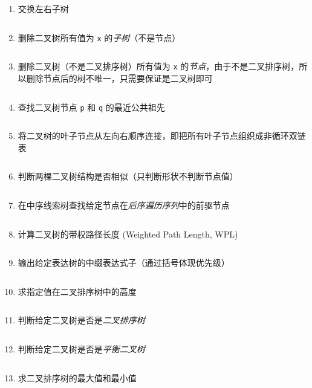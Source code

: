 \documentclass{ctexart}
\begin{document}
\begin{enumerate}
    \item 交换左右子树
        \inputminted{c}{codes/swap-bitree.c}

    \item 删除二叉树所有值为 \texttt{x} 的\emph{子树}（不是节点）
        \inputminted{c}{codes/delete-all-subtree-x-from-bitree.c}

    \item 删除二叉树（不是二叉排序树）所有值为 \texttt{x} 的\emph{节点}，由于不是二叉排序树，所以删除节点后的树不唯一，只需要保证是二叉树即可
        \inputminted{c}{codes/delete-all-x-from-bitree.c}

    \item 查找二叉树节点 \texttt{p} 和 \texttt{q} 的最近公共祖先
        \inputminted{c}{codes/common-ancestor.c}

    \item 将二叉树的叶子节点从左向右顺序连接，即把所有叶子节点组织成非循环双链表
        \inputminted{c}{codes/link-leafs-of-bitree.c}

    \item 判断两棵二叉树结构是否相似（只判断形状不判断节点值）
        \inputminted{c}{codes/is-same-bitree.c}

    \item 在中序线索树查找给定节点在\emph{后序遍历序列}中的前驱节点
        \inputminted{c}{codes/find-previous-node-of-postorder-in-inthreadtree.c}

    \item 计算二叉树的带权路径长度 (Weighted Path Length, WPL)
        \inputminted{c}{codes/weighted-path-length-of-bitree.c}

    \item 输出给定表达树的中缀表达式子（通过括号体现优先级）
        \inputminted{c}{codes/print-expression-bitree.c}

    \item 求指定值在二叉排序树中的高度
        \inputminted{c}{codes/height-of-value-in-bsttree.c}

    \item 判断给定二叉树是否是\emph{二叉排序树}
        \inputminted{c}{codes/is-bsttree.c}


    \item 判断给定二叉树是否是\emph{平衡二叉树}
        \inputminted{c}{codes/is-avl-tree.c}

    \item 求二叉排序树的最大值和最小值
        \inputminted{c}{codes/max-and-min-value-in-bsttree.c}


\end{enumerate}
\end{document}

